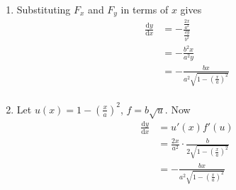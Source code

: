 \documentclass[10pt]{article}
\begin{document}
\begin{enumerate}
\begin{enumerate}
                        \item Substituting $F_x$ and $F_y$ in terms of $x$ gives
                            \begin{align*}
                                \frac{\text{d}y}{\text{d}x} &= -\frac{\frac{2x}{a^2}}{\frac{2y}{b^2}} \\
                                &= -\frac{b^2x}{a^2y} \\
                                &= -\frac{bx}{a^2\sqrt{1 - \left(\frac{x}{a}\right)^2}} \\
                            \end{align*}
                        \item Let $u(x) = 1 - \left(\frac{x}{a}\right)^2$, $f = b\sqrt{u}$. Now 
                            \begin{align*}
                                \frac{\text{d}y}{\text{d}x} &= u'(x)f'(u) \\
                                &= \frac{2x}{a^2} \cdot \frac{b}{2\sqrt{1 - \left(\frac{x}{a}\right)^2}} \\
                                &= -\frac{bx}{a^2\sqrt{1 - \left(\frac{x}{a}\right)^2}} \\
                            \end{align*}
                    \end{enumerate}
    \end{enumerate}
\end{document}
